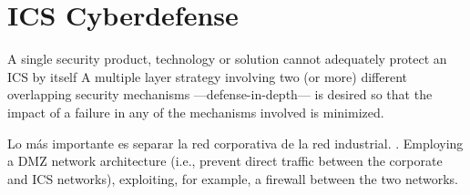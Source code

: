 \chapter{ICS Cyberdefense}

A single security product, technology or solution cannot adequately protect an ICS
by itself
A multiple layer strategy involving two (or more) different overlapping security
mechanisms  ---defense-in-depth--- is desired so that the
impact of a failure in any of the mechanisms involved is minimized.

Lo más importante es separar la red corporativa de la red industrial.
.
Employing a DMZ network architecture (i.e., prevent direct traffic between
the corporate and ICS networks), exploiting, for example, a firewall between the two networks.
